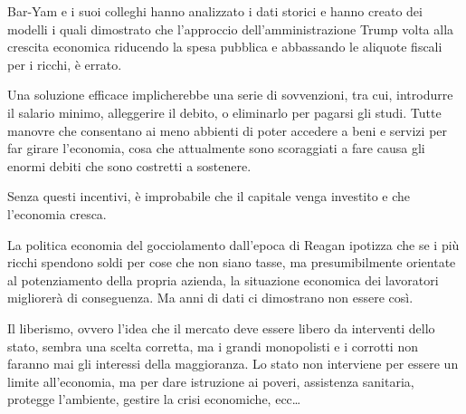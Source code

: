 \documentclass[12pt]{book} %
\begin{document}
\bigskip

Bar-Yam e i suoi colleghi hanno analizzato i dati storici e hanno creato dei modelli i quali dimostrato che l'approccio
dell'amministrazione Trump volta alla crescita economica riducendo la spesa pubblica e abbassando le aliquote fiscali
per i ricchi, è errato.

Una soluzione efficace implicherebbe una serie di sovvenzioni, tra cui, introdurre il salario minimo, alleggerire il
debito, o eliminarlo per pagarsi gli studi. Tutte manovre che consentano ai meno abbienti di poter accedere a beni e
servizi per far girare l'economia, cosa che attualmente sono scoraggiati a fare causa gli enormi
debiti che sono costretti a sostenere. 

Senza questi incentivi, è improbabile che il capitale venga investito e che l'economia
cresca.

La politica economia del gocciolamento dall'epoca di Reagan ipotizza che se i più ricchi spendono
soldi per cose che non siano tasse, ma presumibilmente orientate al potenziamento della propria azienda, la situazione
economica dei lavoratori migliorerà di conseguenza. Ma anni di dati ci dimostrano non essere
così.


\bigskip

Il liberismo, ovvero l'idea che il mercato deve essere libero da interventi dello stato, sembra una
scelta corretta, ma i grandi monopolisti e i corrotti non faranno mai gli interessi della maggioranza. Lo stato non
interviene per essere un limite all'economia, ma per dare istruzione ai poveri, assistenza
sanitaria, protegge l'ambiente, gestire la crisi economiche, ecc… 


\bigskip
\end{document}
